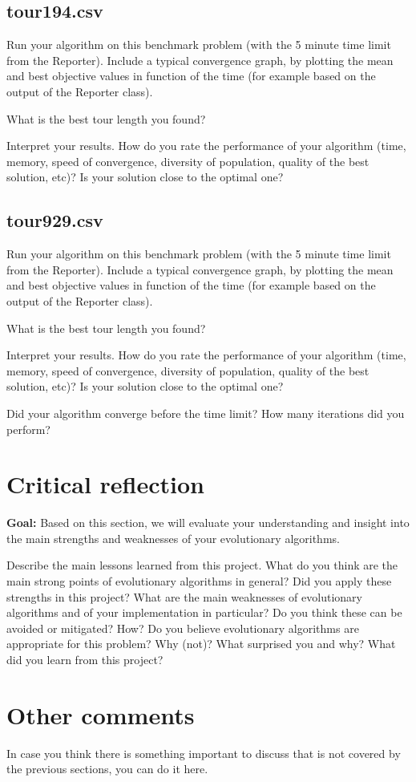 \documentclass[a4paper,10pt]{article}
\newcommand{\ReplaceMe}[1]{{\color{blue}#1}}
\newcommand{\RemoveMe}[1]{{\color{purple}#1}}
\begin{document}
\subsection{tour194.csv}

\ReplaceMe{Run your algorithm on this benchmark problem (with the 5 minute time limit from the Reporter). Include a typical convergence graph, by plotting the mean and best objective values in function of the time (for example based on the output of the Reporter class). 

What is the best tour length you found? 

Interpret your results. How do you rate the performance of your algorithm (time, memory, speed of convergence, diversity of population, quality of the best solution, etc)? Is your solution close to the optimal one?}

\subsection{tour929.csv}

\ReplaceMe{Run your algorithm on this benchmark problem (with the 5 minute time limit from the Reporter). Include a typical convergence graph, by plotting the mean and best objective values in function of the time (for example based on the output of the Reporter class). 

What is the best tour length you found? 

Interpret your results. How do you rate the performance of your algorithm (time, memory, speed of convergence, diversity of population, quality of the best solution, etc)? Is your solution close to the optimal one? 

Did your algorithm converge before the time limit? How many iterations did you perform?}



\section{Critical reflection}

\RemoveMe{\textbf{Goal:} Based on this section, we will evaluate your understanding and insight into the main strengths and weaknesses of your evolutionary algorithms.}

\ReplaceMe{Describe the main lessons learned from this project. What do you think are the main strong points of evolutionary algorithms in general? Did you apply these strengths in this project? What are the main weaknesses of evolutionary algorithms and of your implementation in particular? Do you think these can be avoided or mitigated? How? Do you believe evolutionary algorithms are appropriate for this problem? Why (not)? What surprised you and why? What did you learn from this project?}

\section{Other comments} \label{sec_other}

\ReplaceMe{In case you think there is something important to discuss that is not covered by the previous sections, you can do it here. }



\end{document}

